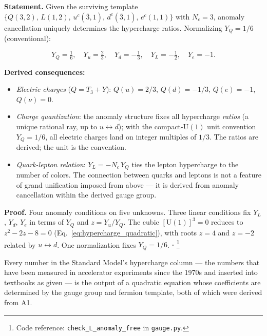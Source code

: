 \documentclass[11pt]{article}
\newenvironment{varlist}{\begin{itemize}[nosep,leftmargin=2em]}{\end{itemize}}
\newcommand{\coderef}[2]{\footnote{Code reference: \texttt{#1} in \texttt{#2}.}}
\newcommand{\U}{\mathrm{U}}
\begin{document}
\begin{tcolorbox}[apfbox, title={$L_{\mathrm{hypercharge}}$ (Unique Hypercharge Assignment)}]
\textbf{Statement.}  Given the surviving template $\{Q(3,2),\, L(1,2),\, u^c(\bar{3},1),\, d^c(\bar{3},1),\, e^c(1,1)\}$ with $N_c = 3$, anomaly cancellation uniquely determines the hypercharge ratios.  Normalizing $Y_Q = 1/6$ (conventional):

\begin{equation}
Y_Q = \tfrac{1}{6}, \quad Y_u = \tfrac{2}{3}, \quad Y_d = -\tfrac{1}{3}, \quad Y_L = -\tfrac{1}{2}, \quad Y_e = -1.
\label{eq:hypercharges}
\end{equation}

\smallskip\noindent\textbf{Derived consequences:}
\begin{varlist}
\item \textit{Electric charges} ($Q = T_3 + Y$): $Q(u) = 2/3$, $Q(d) = -1/3$, $Q(e) = -1$, $Q(\nu) = 0$.
\item \textit{Charge quantization}: the anomaly structure fixes all hypercharge \emph{ratios} (a unique rational ray, up to $u \leftrightarrow d$); with the compact-$\U(1)$ unit convention $Y_Q = 1/6$, all electric charges land on integer multiples of $1/3$.  The ratios are derived; the unit is the convention.
\item \textit{Quark-lepton relation}: $Y_L = -N_c \, Y_Q$ ties the lepton hypercharge to the number of colors.  The connection between quarks and leptons is not a feature of grand unification imposed from above --- it is derived from anomaly cancellation within the derived gauge group.
\end{varlist}

\smallskip\noindent\textbf{Proof.}  Four anomaly conditions on five unknowns.  Three linear conditions fix $Y_L$, $Y_d$, $Y_e$ in terms of $Y_Q$ and $z = Y_u/Y_Q$.  The cubic $[\U(1)]^3 = 0$ reduces to $z^2 - 2z - 8 = 0$ (Eq.~\ref{eq:hypercharge_quadratic}), with roots $z = 4$ and $z = -2$ related by $u \leftrightarrow d$.  One normalization fixes $Y_Q = 1/6$.  $\square$
\coderef{check\_L\_anomaly\_free}{gauge.py}
\end{tcolorbox}

Every number in the Standard Model's hypercharge column --- the numbers that have been measured in accelerator experiments since the 1970s and inserted into textbooks as given --- is the output of a quadratic equation whose coefficients are determined by the gauge group and fermion template, both of which were derived from A1.
\end{document}
